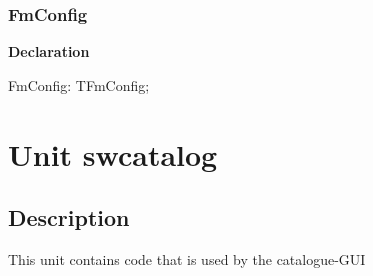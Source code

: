 \documentclass{report}
\newif\ifpdf
\begin{document}
\subsection*{FmConfig}
\fi
\label{settings-FmConfig}
\begin{list}{}{
\setlength{\itemindent}{0cm}
\setlength{\listparindent}{0cm}
\setlength{\leftmargin}{\evensidemargin}
\addtolength{\leftmargin}{\tmplength}
\settowidth{\labelsep}{X}
\addtolength{\leftmargin}{\labelsep}
\setlength{\labelwidth}{\tmplength}
}
\item[\textbf{Declaration}\hfill]
\ifpdf
\begin{flushleft}
\fi
\begin{ttfamily}
FmConfig: TFmConfig;\end{ttfamily}

\ifpdf
\end{flushleft}
\fi

\end{list}
\chapter{Unit swcatalog}
\label{swcatalog}
\section{Description}
This unit contains code that is used by the catalogue{-}GUI
\end{document}
